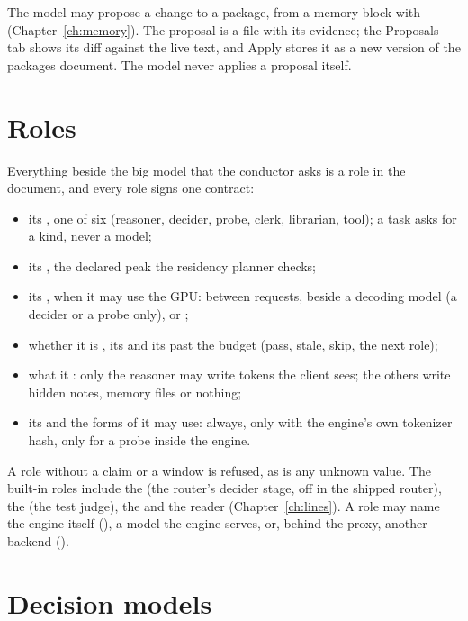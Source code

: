 The model may propose a change to a package, from a memory block with  (Chapter~\ref{ch:memory}). The proposal is a file with its evidence; the Proposals tab shows its diff against the live text, and Apply stores it as a new version of the packages document. The model never applies a proposal itself.

\section{Roles}\label{sec:roles}

Everything beside the big model that the conductor asks is a role in the  document, and every role signs one contract:

\begin{itemize}
\item its , one of six (reasoner, decider, probe, clerk, librarian, tool); a task asks for a kind, never a model;
\item its , the declared peak the residency planner checks;
\item its , when it may use the GPU:  between requests,  beside a decoding model (a decider or a probe only), or ;
\item whether it is , its  and its  past the budget (pass, stale, skip, the next role);
\item what it : only the reasoner may write tokens the client sees; the others write hidden notes, memory files or nothing;
\item its  and the forms of  it may use:  always,  only with the engine's own tokenizer hash,  only for a probe inside the engine.
\end{itemize}

A role without a claim or a window is refused, as is any unknown value. The built-in roles include the  (the router's decider stage, off in the shipped router), the  (the test judge), the  and the  reader (Chapter~\ref{ch:lines}). A role may name the engine itself (), a model the engine serves, or, behind the proxy, another backend ().

\section{Decision models}\label{sec:deciders}


